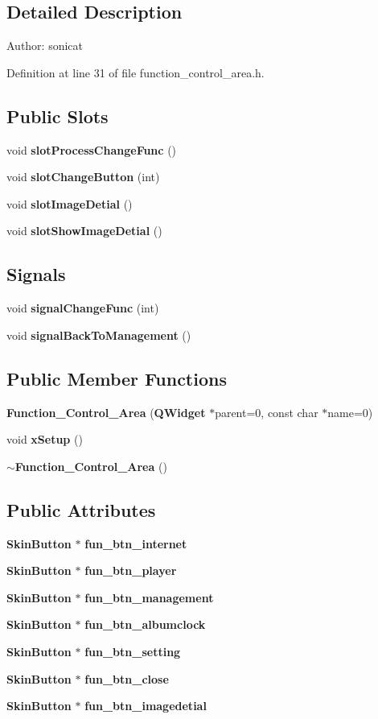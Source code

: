 \subsection{Detailed Description}
\begin{Desc}
\item[Author:]sonicat \end{Desc}




Definition at line 31 of file function\_\-control\_\-area.h.\subsection*{Public Slots}
\begin{CompactItemize}
\item 
void {\bf slot\-Process\-Change\-Func} ()
\item 
void {\bf slot\-Change\-Button} (int)
\item 
void {\bf slot\-Image\-Detial} ()
\item 
void {\bf slot\-Show\-Image\-Detial} ()
\end{CompactItemize}
\subsection*{Signals}
\begin{CompactItemize}
\item 
void {\bf signal\-Change\-Func} (int)
\item 
void {\bf signal\-Back\-To\-Management} ()
\end{CompactItemize}
\subsection*{Public Member Functions}
\begin{CompactItemize}
\item 
{\bf Function\_\-Control\_\-Area} ({\bf QWidget} $\ast$parent=0, const char $\ast$name=0)
\item 
void {\bf x\-Setup} ()
\item 
{\bf $\sim$Function\_\-Control\_\-Area} ()
\end{CompactItemize}
\subsection*{Public Attributes}
\begin{CompactItemize}
\item 
{\bf Skin\-Button} $\ast$ {\bf fun\_\-btn\_\-internet}
\item 
{\bf Skin\-Button} $\ast$ {\bf fun\_\-btn\_\-player}
\item 
{\bf Skin\-Button} $\ast$ {\bf fun\_\-btn\_\-management}
\item 
{\bf Skin\-Button} $\ast$ {\bf fun\_\-btn\_\-albumclock}
\item 
{\bf Skin\-Button} $\ast$ {\bf fun\_\-btn\_\-setting}
\item 
{\bf Skin\-Button} $\ast$ {\bf fun\_\-btn\_\-close}
\item 
{\bf Skin\-Button} $\ast$ {\bf fun\_\-btn\_\-imagedetial}
\end{CompactItemize}
